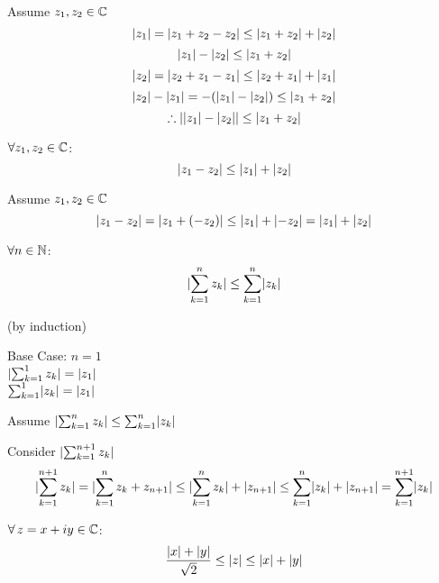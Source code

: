 \documentclass[letterpaper,12pt,fleqn]{article}
\begin{document}
\begin{theproof}[alternate]
  Assume $z_1,z_2\in\mathbb{C}$ \\
  \[\lvert z_1\rvert=\lvert z_1+z_2-z_2\rvert\le\lvert z_1+z_2\rvert+\lvert z_2\rvert\]
  \[\lvert z_1\rvert-\lvert z_2\rvert\le\lvert z_1+z_2\rvert\]
  \[\lvert z_2\rvert=\lvert z_2+z_1-z_1\rvert\le\lvert z_2+z_1\rvert+\lvert z_1\rvert\]
  \[\lvert z_2\rvert-\lvert z_1\rvert=-(\lvert z_1\rvert-\lvert z_2\rvert)\le\lvert z_1+z_2\rvert\]
  \[\therefore\lvert\lvert z_1\rvert-\lvert z_2\rvert\rvert\le\lvert z_1+z_2\rvert\]
\end{theproof}

\begin{corollary}
$\forall z_1,z_2\in\mathbb{C}$:
\[\lvert z_1-z_2\rvert\le\lvert z_1\rvert+\lvert z_2\rvert\]
\end{corollary}

\begin{theproof}
Assume $z_1,z_2\in\mathbb{C}$ \\
\[\lvert z_1-z_2\rvert=\lvert z_1+(-z_2)\rvert\le\lvert z_1\rvert+\lvert-z_2\rvert=\lvert z_1\rvert+\lvert z_2\rvert\]
\end{theproof}

\begin{theorem}
$\forall n\in\mathbb{N}$:
\[\lvert\sum_{k=1}^{n}z_k\rvert\le\sum_{k=1}^{n}\lvert z_k\rvert\]
\end{theorem}

\begin{theproof}
(by induction)
\begin{description}
\item{Base Case: $n=1$} \\
$\lvert\sum_{k=1}^{1}z_k\rvert=\lvert z_1\rvert$ \\
$\sum_{k=1}^{1}\lvert z_k\rvert=\lvert z_1\rvert$

\item{Assume $\lvert\sum_{k=1}^{n}z_k\rvert\le\sum_{k=1}^{n}\lvert z_k\rvert$}

\item Consider $\lvert\sum_{k=1}^{n+1}z_k\rvert$
  \[\lvert\sum_{k=1}^{n+1}z_k\rvert=\lvert\sum_{k=1}^{n}z_k+z_{n+1}\rvert\le
  \lvert\sum_{k=1}^{n}z_k\rvert+\lvert z_{n+1}\rvert\le
  \sum_{k=1}^{n}\lvert z_k\rvert+\lvert z_{n+1}\rvert=
  \sum_{k=1}^{n+1}\lvert z_k\rvert\]
\end{description}
\end{theproof}

\begin{theorem}
  $\forall\,z=x+iy\in\mathbb{C}$:
  \[\frac{\lvert x\rvert+\lvert y\rvert}{\sqrt{2}}\le\lvert z\rvert\le\lvert x\rvert+\lvert y\rvert\]
\end{theorem}
\end{document}
